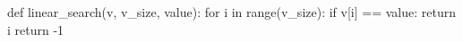 \begin{unipdcode}[language=Python]
def linear_search(v, v_size, value):
    for i in range(v_size):
        if v[i] == value:
            return i
    return -1
\end{unipdcode}
